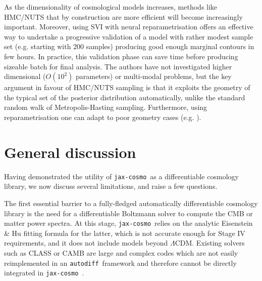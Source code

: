 \documentclass[twocolumn,twocolappendix,nofootinbib,iop]{openjournal}
\newcommand{\JZ}[1]{{\color{purple}JZ: #1}}
\newcommand{\jaxcosmo}{\texttt{jax-cosmo}}
\newcommand{\autodiff}{\texttt{autodiff}}
\begin{document}


As the dimensionality of cosmological models increases, methods like HMC/NUTS that by construction are more efficient will become increasingly important. Moreover, using SVI with neural reparametrisation offers an effective way to undertake a progressive validation of a model with rather modest sample set (e.g. starting with 200 samples) producing good enough marginal contours in few hours. In practice, this validation phase can save time before producing sizeable batch for final analysis. The authors have not investigated higher dimensional ($O(10^2)$ parameters) or multi-modal problems, but the key argument in favour of HMC/NUTS sampling is that it exploits the geometry of the typical set of the posterior distribution automatically, unlike the standard random walk of Metropolis-Hasting sampling. Furthermore, using reparametrisation  one can adapt to poor geometry cases (e.g. \citealp{2019arXiv190303704H}).
%

%
\section{General discussion}
\label{sec-discussion}
%
Having demonstrated the utility of \jaxcosmo\ as a differentiable cosmology library, we now discuss several limitations, and raise a few questions.

The first essential barrier to a fully-fledged automatically differentiable cosmology library is the need for a differentiable Boltzmann solver to compute the CMB or matter power spectra. At this stage, \jaxcosmo\ relies on the analytic Eisenstein \& Hu fitting formula for the latter, which is not accurate enough for Stage IV \citep{detf} requirements, and it does not include models beyond $\Lambda$CDM. Existing solvers such as CLASS \citep{2011JCAP...07..034B} or CAMB \citep{camb} are large and complex codes which are not easily reimplemented in an \autodiff\ framework and therefore cannot be directly integrated in \jaxcosmo\ .
\end{document}
